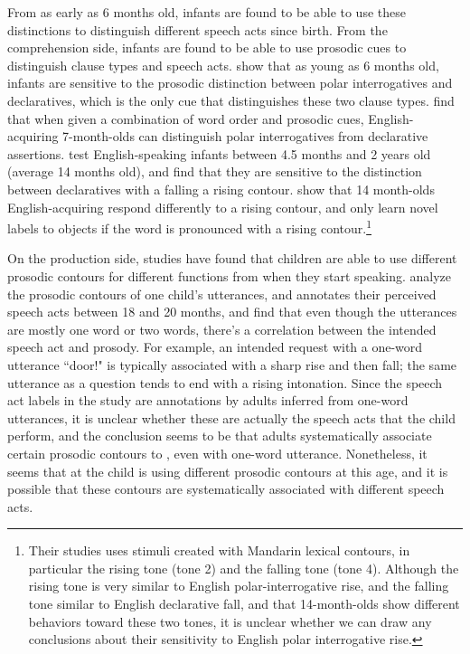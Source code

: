 From as early as 6 months old, infants are found to be able to use these distinctions to distinguish different speech acts since birth. From the comprehension side, infants are found to be able to use prosodic cues to distinguish clause types and speech acts. \textcite{frota2014} show that as young as 6 months old, infants are sensitive to the prosodic distinction between polar interrogatives and declaratives, which is the only cue that distinguishes these two clause types. \textcite{geffenmintz2011} find that when given a combination of word order and prosodic cues, English-acquiring 7-month-olds can distinguish polar interrogatives from declarative assertions. \textcite{soderstrom2005clause} test English-speaking infants between 4.5 months and 2 years old (average 14 months old), and find that they are sensitive to the distinction between declaratives with a falling a rising contour. \textcite{} show that 14 month-olds English-acquiring respond differently to a rising contour, and only learn novel labels to objects if the word is pronounced with a rising contour.\footnote{Their studies uses stimuli created with Mandarin lexical contours, in particular the rising tone (tone 2) and the falling tone (tone 4). Although the rising tone is very similar to English polar-interrogative rise, and the falling tone similar to English declarative fall, and that 14-month-olds show different behaviors toward these two tones, it is unclear whether we can draw any conclusions about their sensitivity to English polar interrogative rise.}


On the production side, studies have found that children are able to use different prosodic contours for different functions from when they start speaking. \textcite{menyuk1969prosody} analyze the prosodic contours of one child's utterances, and annotates their perceived speech acts between 18  and 20 months, and find that even though the utterances are mostly one word or two words, there's a correlation between the intended speech act and prosody. For example, an intended request with a one-word utterance ``door!" is typically associated with a sharp rise and then fall; the same utterance as a question tends to end with a rising intonation. Since the speech act labels in the study are annotations by adults inferred from one-word utterances, it is unclear whether these are actually the speech acts that the child perform, and the conclusion seems to be that adults systematically associate certain prosodic contours to \aqrs{}, even with one-word utterance. Nonetheless, it seems that at the child is using different prosodic contours at this age, and it is possible that these contours are systematically associated with different speech acts. 

